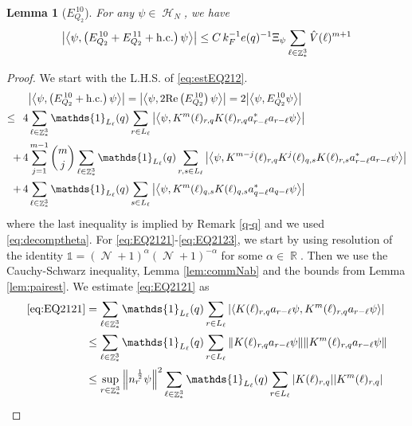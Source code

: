 \documentclass[sn-mathphys, Numbered ,a4paper]{sn-jnl}%
\DeclareMathOperator{\R}{\mathbb{R}}
\DeclareMathOperator{\Z}{\mathbb{Z}}
\DeclareMathOperator{\HH}{\mathcal{H}}
\DeclareMathOperator{\NN}{\mathcal{N}}
\newcommand{\half}{\frac{1}{2}}
\newcommand{\eva}[1]{\left\langle #1 \right\rangle}
\theoremstyle{plain}
\newtheorem{lemma}[theorem]{Lemma}
\theoremstyle{definition}
\theoremstyle{remark}
\theoremstyle{plain}
\theoremstyle{definition}
\theoremstyle{remark}
\begin{document}
\begin{lemma}[$E_{Q_2}^{\,10}$]\label{lem:EQ212}
	For any $\psi \in \HH_N$, we have
	\begin{alignat}{2}
		\abs{\eva{\psi,\left(E^{\,10 }_{Q_2}+E^{\,11}_{Q_2}+\mathrm{h.c.}\right) \psi }}
		\leq   C\, k_{F}^{-1} e(q)^{-1} \Xi_{\psi} \sum\limits_{\ell \in \Z^3_*} \hat{V}(\ell)^{m+1} \label{eq:estEQ212}
	\end{alignat}
\end{lemma}
\begin{proof}
	We start with the L.H.S. of \eqref{eq:estEQ212}.
	\begin{align}
		&\abs{\eva{\psi,\left(E^{\,10}_{Q_2}+\mathrm{h.c.}\right) \psi }} = \abs{\eva{\psi,2\mathrm{Re}\left(E^{\,10}_{Q_2}\right) \psi }} = 2\abs{\eva{\psi, E^{\,10}_{Q_2} \psi }}\nonumber\\
		\leq\,\;4& \sum\limits_{\ell\in \Z^3_*} \mathds{1}_{L_{\ell}}(q) \sum\limits_{r\in L_{\ell}} \abs{\eva{\psi, K^m(\ell)_{r,q} K(\ell)_{r,q} a^*_{r-\ell} a_{r-\ell} \psi }}\label{eq:EQ2121}\\
		+\,4& \sum\limits_{j=1}^{m-1} {{m}\choose j} \sum\limits_{\ell \in \Z^3_*}\mathds{1}_{L_{\ell}}(q) \sum\limits_{r,s\in L_{\ell}}  \abs{\eva{\psi, K^{m-j}(\ell)_{r,q} K^{j}(\ell)_{q,s} K(\ell)_{r,s} a^*_{r-\ell} a_{r-\ell} \psi }} \label{eq:EQ2122}\\
		+\,4&\sum\limits_{\ell \in \Z^3_*} \mathds{1}_{L_{\ell}}(q) \sum\limits_{ s \in L_{\ell}} \abs{\eva{\psi, K^m(\ell)_{q,s} K(\ell)_{q,s} a^*_{q-\ell} a_{q-\ell} \psi }}\label{eq:EQ2123}
	\end{align}
	where the last inequality is implied by Remark \ref{q-q} and we used \eqref{eq:decomptheta}.
	For \eqref{eq:EQ2121}-\eqref{eq:EQ2123}, we start by using resolution of the identity $\mathds{1} = (\NN+1)^{\alpha}(\NN+1)^{-\alpha}$ for some $\alpha \in \R$. Then we use the Cauchy-Schwarz inequality, Lemma \ref{lem:commNab} and the bounds from Lemma \ref{lem:pairest}.
	We estimate \eqref{eq:EQ2121} as 
	\begin{align}
		\eqref{eq:EQ2121}
		&= \sum\limits_{\ell \in \Z^3_*} \mathds{1}_{L_{\ell}}(q) \sum\limits_{r\in L_{\ell}} \abs{\eva{ K(\ell)_{r,q} a_{r-\ell} \psi, K^m(\ell)_{r,q}  a_{r-\ell} \psi }}\nonumber\\
		&\leq \sum\limits_{\ell \in \Z^3_*} \mathds{1}_{L_{\ell}}(q) \sum\limits_{r\in L_{\ell}} \norm{ K(\ell)_{r,q} a_{r-\ell} \psi}\norm{ K^m(\ell)_{r,q}  a_{r-\ell} \psi }\nonumber\\
		&\leq \sup\limits_{r\in \Z^3_*} \norm{n_r^{\,\half}\psi}^2 \sum\limits_{\ell \in \Z^3_*} \mathds{1}_{L_{\ell}}(q) \sum\limits_{r\in L_{\ell}} \abs{ K(\ell)_{r,q} } \abs{ K^m(\ell)_{r,q} }\nonumber\\

\end{align}
\end{proof}
\end{document}

